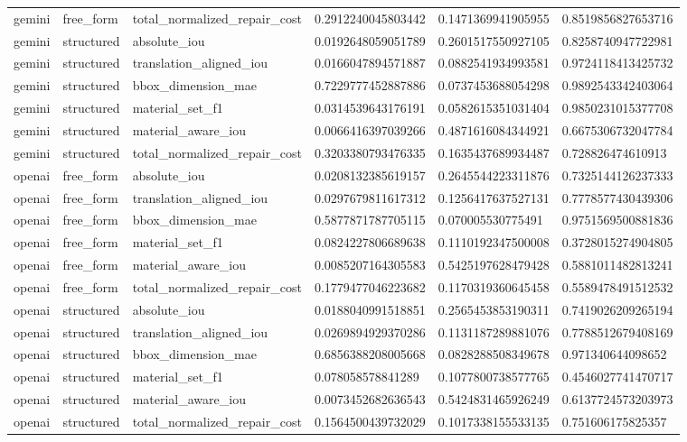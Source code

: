 \begin{tabular}{llllll}
gemini & free\_form & total\_normalized\_repair\_cost & 0.2912240045803442 & 0.1471369941905955 & 0.8519856827653716 \\
gemini & structured & absolute\_iou & 0.0192648059051789 & 0.2601517550927105 & 0.8258740947722981 \\
gemini & structured & translation\_aligned\_iou & 0.0166047894571887 & 0.0882541934993581 & 0.9724118413425732 \\
gemini & structured & bbox\_dimension\_mae & 0.7229777452887886 & 0.0737453688054298 & 0.9892543342403064 \\
gemini & structured & material\_set\_f1 & 0.0314539643176191 & 0.0582615351031404 & 0.9850231015377708 \\
gemini & structured & material\_aware\_iou & 0.0066416397039266 & 0.4871616084344921 & 0.6675306732047784 \\
gemini & structured & total\_normalized\_repair\_cost & 0.3203380793476335 & 0.1635437689934487 & 0.728826474610913 \\
openai & free\_form & absolute\_iou & 0.0208132385619157 & 0.2645544223311876 & 0.7325144126237333 \\
openai & free\_form & translation\_aligned\_iou & 0.0297679811617312 & 0.1256417637527131 & 0.7778577430439306 \\
openai & free\_form & bbox\_dimension\_mae & 0.5877871787705115 & 0.070005530775491 & 0.9751569500881836 \\
openai & free\_form & material\_set\_f1 & 0.0824227806689638 & 0.1110192347500008 & 0.3728015274904805 \\
openai & free\_form & material\_aware\_iou & 0.0085207164305583 & 0.5425197628479428 & 0.5881011482813241 \\
openai & free\_form & total\_normalized\_repair\_cost & 0.1779477046223682 & 0.1170319360645458 & 0.5589478491512532 \\
openai & structured & absolute\_iou & 0.0188040991518851 & 0.2565453853190311 & 0.7419026209265194 \\
openai & structured & translation\_aligned\_iou & 0.0269894929370286 & 0.1131187289881076 & 0.7788512679408169 \\
openai & structured & bbox\_dimension\_mae & 0.6856388208005668 & 0.0828288508349678 & 0.971340644098652 \\
openai & structured & material\_set\_f1 & 0.078058578841289 & 0.1077800738577765 & 0.4546027741470717 \\
openai & structured & material\_aware\_iou & 0.0073452682636543 & 0.5424831465926249 & 0.6137724573203973 \\
openai & structured & total\_normalized\_repair\_cost & 0.1564500439732029 & 0.1017338155533135 & 0.751606175825357 \\
\end{tabular}

